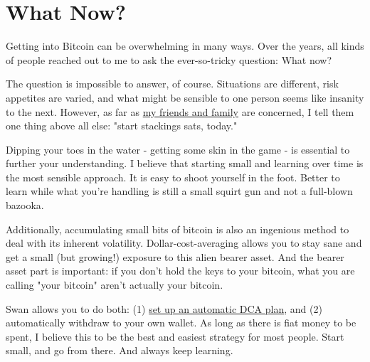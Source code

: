 \chapter*{What Now?}

Getting into Bitcoin can be overwhelming in many ways. Over the years, all kinds
of people reached out to me to ask the ever-so-tricky question: What now?

The question is impossible to answer, of course. Situations are different, risk
appetites are varied, and what might be sensible to one person seems like
insanity to the next. However, as far as
\href{https://dergigi.com/2020/04/27/dear-family-dear-friends/}{my friends and
family} are concerned, I tell them one thing above all else: "start stackings
sats, today."

Dipping your toes in the water - getting some skin in the game - is essential to
further your understanding. I believe that starting small and learning over time
is the most sensible approach. It is easy to shoot yourself in the foot. Better
to learn while what you're handling is still a small squirt gun and not a
full-blown bazooka.

Additionally, accumulating small bits of bitcoin is also an ingenious method to
deal with its inherent volatility. Dollar-cost-averaging allows you to stay sane
and get a small (but growing!) exposure to this alien bearer asset. And the
bearer asset part is important: if you don't hold the keys to your bitcoin, what
you are calling "your bitcoin" aren't actually your bitcoin.

Swan allows you to do both: (1) \href{https://www.swanbitcoin.com/}{set up an
automatic DCA plan}, and (2) automatically withdraw to your own wallet. As long
as there is fiat money to be spent, I believe this to be the best and easiest
strategy for most people. Start small, and go from there. And always keep
learning.
